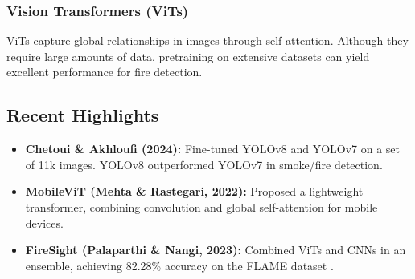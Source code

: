 \subsubsection{Vision Transformers (ViTs)}
ViTs capture global relationships in images through self-attention.
Although they require large amounts of data, pretraining on extensive datasets can yield excellent
performance for fire detection.

\subsection{Recent Highlights}
\label{subsec:recent-highlights}

\begin{itemize}
    \item \textbf{Chetoui \& Akhloufi (2024):} Fine-tuned YOLOv8 and YOLOv7 on a set of
    11k images. YOLOv8 outperformed YOLOv7 in smoke/fire detection.
    \item \textbf{MobileViT (Mehta \& Rastegari, 2022):} Proposed a lightweight transformer,
    combining convolution and global self-attention for mobile devices.
    \item \textbf{FireSight (Palaparthi \& Nangi, 2023):} Combined ViTs and CNNs in an ensemble,
    achieving 82.28\% accuracy on the FLAME dataset \cite{firesight2023}.
\end{itemize}
